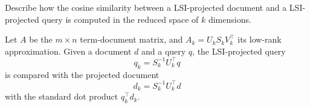\exercise

Describe how the cosine similarity between a LSI-projected document and a
LSI-projected query is computed in the reduced space of $k$ dimensions.

\solution

Let $A$ be the $m \times n$ term-document matrix, and $A_k = U_kS_kV_k^\top$
its low-rank approximation. Given a document $d$ and a query $q$, the
LSI-projected query
%
$$q_k = S_k^{-1} U_k^\top q$$
%
is compared with the projected document
%
$$d_k = S_k^{-1} U_k^\top d$$
%
with the standard dot product $q_k^\top d_k$.